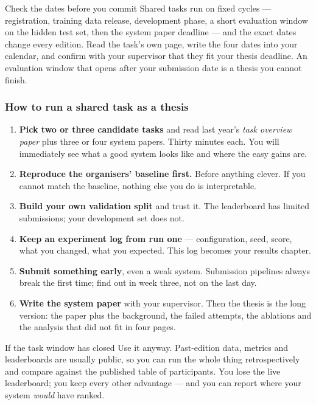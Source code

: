 \documentclass[11pt,a4paper]{article}
\begin{document}
\begin{wbox}{Check the dates before you commit}
Shared tasks run on fixed cycles --- registration, training data release,
development phase, a short evaluation window on the hidden test set, then the
system paper deadline --- and the exact dates change every edition. Read the
task's own page, write the four dates into your calendar, and confirm with your
supervisor that they fit your thesis deadline. An evaluation window that opens
after your submission date is a thesis you cannot finish.
\end{wbox}

\subsubsection*{How to run a shared task as a thesis}

\begin{enumerate}
  \item \textbf{Pick two or three candidate tasks} and read last year's
        \emph{task overview paper} plus three or four system papers. Thirty
        minutes each. You will immediately see what a good system looks like
        and where the easy gains are.
  \item \textbf{Reproduce the organisers' baseline first.} Before anything
        clever. If you cannot match the baseline, nothing else you do is
        interpretable.
  \item \textbf{Build your own validation split} and trust it. The leaderboard
        has limited submissions; your development set does not.
  \item \textbf{Keep an experiment log from run one} --- configuration, seed,
        score, what you changed, what you expected. This log becomes your
        results chapter.
  \item \textbf{Submit something early}, even a weak system. Submission
        pipelines always break the first time; find out in week three, not on
        the last day.
  \item \textbf{Write the system paper} with your supervisor. Then the thesis
        is the long version: the paper plus the background, the failed
        attempts, the ablations and the analysis that did not fit in four
        pages.
\end{enumerate}

\begin{cbox}{If the task window has closed}
Use it anyway. Past-edition data, metrics and leaderboards are usually public,
so you can run the whole thing retrospectively and compare against the
published table of participants. You lose the live leaderboard; you keep every
other advantage --- and you can report where your system \emph{would} have
ranked.
\end{cbox}
\end{document}
